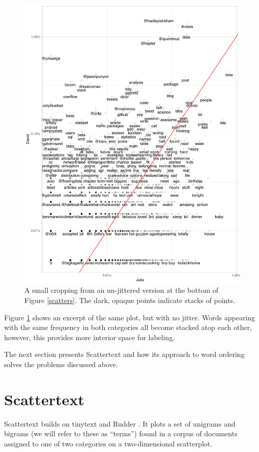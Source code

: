 \documentclass[11pt,a4paper]{article}
\begin{document}
\begin{figure}[h]
\vspace{-.25cm}
\includegraphics[width=\columnwidth]{tidytext_horiz}
\caption{A small cropping from an un-jittered version at the bottom of Figure \ref{scatters}.  The dark, opaque points indicate stacks of points.}
\label{nojitterfig}
\vspace{-.25cm}
\end{figure}
Figure \ref{nojitterfig} shows an excerpt of the same plot, but with no jitter.  Words appearing with the same frequency in both categories all become stacked atop each other, however, this provides more interior space for labeling. 

The next section presents Scattertext and how its approach to word ordering solves the problems discussed above. 
\section{Scattertext}
\label{scattertext}
Scattertext builds on tinytext and Rudder .  It plots a set of unigrams and bigrams (we will refer to these as ``terms'') found in a corpus of documents assigned to one of two categories on a two-dimensional scatterplot.  
\end{document}

